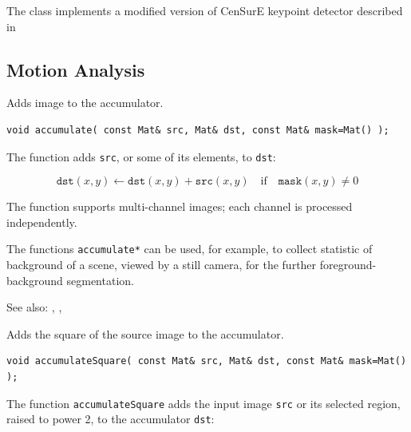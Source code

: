 The class implements a modified version of CenSurE keypoint detector described in
\cite{Agrawal08}

\subsection{Motion Analysis}

\label{accumulate}
Adds image to the accumulator.

\begin{lstlisting}
void accumulate( const Mat& src, Mat& dst, const Mat& mask=Mat() );
\end{lstlisting}
\begin{description}
\end{description}

The function adds \texttt{src}, or some of its elements, to \texttt{dst}:

\[ \texttt{dst}(x,y) \leftarrow \texttt{dst}(x,y) + \texttt{src}(x,y) \quad \text{if} \quad \texttt{mask}(x,y) \ne 0 \]

The function supports multi-channel images; each channel is processed independently.

The functions \texttt{accumulate*} can be used, for example, to collect statistic of background of a scene, viewed by a still camera, for the further foreground-background segmentation.

See also: , , 

\label{accumulateSquare}
Adds the square of the source image to the accumulator.

\begin{lstlisting}
void accumulateSquare( const Mat& src, Mat& dst, const Mat& mask=Mat() );
\end{lstlisting}
\begin{description}
\end{description}

The function \texttt{accumulateSquare} adds the input image \texttt{src} or its selected region, raised to power 2, to the accumulator \texttt{dst}:

